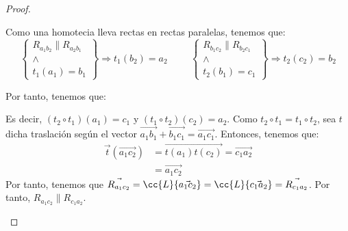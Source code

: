 \begin{proof}
\begin{enumerate}
        Como una homotecia lleva rectas en rectas paralelas, tenemos que:
        \begin{equation*}
            \left\{
                \begin{array}{c}
                    R_{a_1b_2} \| R_{a_2b_1} \\
                    \land \\
                    t_1(a_1) = b_1
                \end{array}
            \right\} \Longrightarrow t_1(b_2)=a_2
            \hspace{1cm}
            \left\{
                \begin{array}{c}
                    R_{b_1c_2} \| R_{b_2c_1} \\
                    \land \\
                    t_2(b_1) = c_1
                \end{array}
            \right\} \Longrightarrow t_2(c_2)=b_2
        \end{equation*}

        Por tanto, tenemos que:
        \begin{figure}[H]
            \centering
        \end{figure}
        Es decir, $(t_2\circ t_1)(a_1)=c_1$ y $(t_1\circ t_2)(c_2)=a_2$. Como $t_2\circ t_1=t_1\circ t_2$, sea $t$ dicha traslación según el vector $\vec{a_1b_1}+\vec{b_1c_1}=\vec{a_1c_1}$. Entonces, tenemos que:
        \begin{equation*}
            \begin{split}
                \vec{t}(\vec{a_1c_2}) &= \vec{t(a_1)t(c_2)} = \vec{c_1a_2} \\
                &= \vec{a_1c_2}
            \end{split} 
        \end{equation*}
        Por tanto, tenemos que $\vec{R_{a_1c_2}} = \cc{L}\{\vec{a_1c_2}\} = \cc{L}\{\vec{c_1a_2}\} = \vec{R_{c_1a_2}}$. Por tanto, $R_{a_1c_2}\| R_{c_1a_2}$.\qedhere
    \end{enumerate}
\end{proof}

